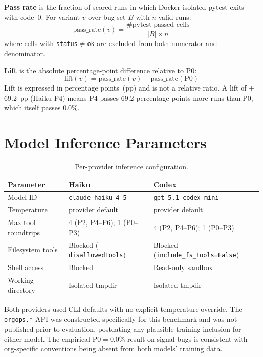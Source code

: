 \documentclass[10pt,a4paper,twocolumn]{article}
\begin{document}
\textbf{Pass rate} is the fraction of scored runs in which
Docker-isolated pytest exits with code~0.
For variant $v$ over bug set $B$ with $n$ valid runs:
\[
  \text{pass\_rate}(v) = \frac{\text{\# pytest-passed cells}}{\lvert B \rvert \times n}
\]
where cells with \texttt{status$\neq$ok} are excluded from both
numerator and denominator.

\textbf{Lift} is the absolute percentage-point difference relative to P0:
\[
  \text{lift}(v) = \text{pass\_rate}(v) - \text{pass\_rate}(\text{P0})
\]
Lift is expressed in percentage points~(pp) and is not a relative ratio.
A lift of $+$69.2~pp (Haiku P4) means P4 passes 69.2 percentage points
more runs than P0, which itself passes 0.0\%.

\section{Model Inference Parameters}
\label{app:model-details}

\begin{table}[h!]
\centering
\caption{Per-provider inference configuration.}
\label{tab:inference-params}
\small
\begin{tabular}{@{}lll@{}}
\toprule
\textbf{Parameter} & \textbf{Haiku} & \textbf{Codex} \\
\midrule
Model ID            & \texttt{claude-haiku-4-5}            & \texttt{gpt-5.1-codex-mini} \\
Temperature         & provider default                     & provider default \\
Max tool roundtrips & 4 (P2, P4--P6); 1 (P0--P3)          & 4 (P2, P4--P6); 1 (P0--P3) \\
Filesystem tools    & Blocked (\texttt{--disallowedTools}) & Blocked (\texttt{include\_fs\_tools=False}) \\
Shell access        & Blocked                              & Read-only sandbox \\
Working directory   & Isolated tmpdir                      & Isolated tmpdir \\
\bottomrule
\end{tabular}
\end{table}

Both providers used CLI defaults with no explicit temperature override.
The \texttt{orgops.*} API was constructed specifically for this benchmark
and was not published prior to evaluation, postdating any plausible
training inclusion for either model.
The empirical P0$=$0.0\% result on signal bugs is consistent with
org-specific conventions being absent from both models' training data.
\end{document}
